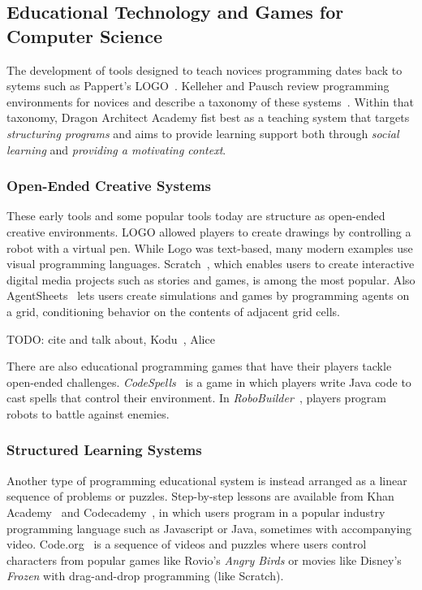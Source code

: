 \documentclass{sig-alternate}
\newcommand{\TODO}[1]{{\color{red} TODO: #1}}
\newcommand{\gametitle}{{\color{RoyalPurple} Dragon Architect Academy}}
\begin{document}
\subsection{Educational Technology and Games for Computer Science}

The development of tools designed to teach novices programming dates back to sytems such as Pappert's LOGO~\cite{papert80mindstorms}.
Kelleher and Pausch review programming environments for novices and describe a taxonomy of these systems~\cite{kelleher2005lowering}.
Within that taxonomy, \gametitle{} fist best as a teaching system that targets \emph{structuring programs} and aims to provide learning support both through \emph{social learning} and \emph{providing a motivating context}.

\subsubsection{Open-Ended Creative Systems}
These early tools and some popular tools today are structure as open-ended creative environments.
LOGO allowed players to create drawings by controlling a robot with a virtual pen.
While Logo was text-based, many modern examples use visual programming languages. 
Scratch~\cite{maloney2010scratch}, which enables users to create interactive digital media projects such as stories and games, is among the most popular.
Also 
AgentSheets~\cite{repenning2000agentsheets} lets users create simulations and games by programming agents on a grid, conditioning behavior on the contents of adjacent grid cells. 

 
\TODO{cite and talk about, Kodu~\cite{maclaurin2009kodu}, Alice~\cite{cooper2000alice}}

There are also educational programming games that have their players tackle open-ended challenges.
\emph{CodeSpells}~\cite{esper2013codespells} is a game in which players write Java code to cast spells that control their environment. 
In \emph{RoboBuilder}~\cite{weintrop2012robobuilder}, players program robots to battle against enemies.

\subsubsection{Structured Learning Systems}
Another type of programming educational system is instead arranged as a linear sequence of problems or puzzles.
Step-by-step lessons are available from Khan Academy~\cite{khanacademy} and Codecademy~\cite{codecademy}, in which users program in a popular industry programming language such as Javascript or Java, sometimes with accompanying video.
Code.org~\cite{codedotorg} is a sequence of videos and puzzles where users control characters from popular games like Rovio's \emph{Angry Birds} or movies like Disney's \emph{Frozen} with drag-and-drop programming (like Scratch).
\end{document}

